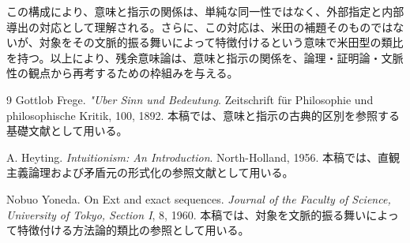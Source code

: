 \documentclass[11pt,a4paper]{article}
\theoremstyle{definition}
\begin{document}
この構成により、意味と指示の関係は、単純な同一性ではなく、外部指定と内部導出の対応として理解される。さらに、この対応は、米田の補題そのものではないが、対象をその文脈的振る舞いによって特徴付けるという意味で米田型の類比を持つ。以上により、残余意味論は、意味と指示の関係を、論理・証明論・文脈性の観点から再考するための枠組みを与える。

\begin{thebibliography}{9}
Gottlob Frege.
\textit{"Uber Sinn und Bedeutung}.
Zeitschrift f\"ur Philosophie und philosophische Kritik, 100, 1892.
本稿では、意味と指示の古典的区別を参照する基礎文献として用いる。

A. Heyting.
\textit{Intuitionism: An Introduction}.
North-Holland, 1956.
本稿では、直観主義論理および矛盾元の形式化の参照文献として用いる。

Nobuo Yoneda.
On Ext and exact sequences.
\textit{Journal of the Faculty of Science, University of Tokyo, Section I}, 8, 1960.
本稿では、対象を文脈的振る舞いによって特徴付ける方法論的類比の参照として用いる。
\end{thebibliography}
\end{document}
